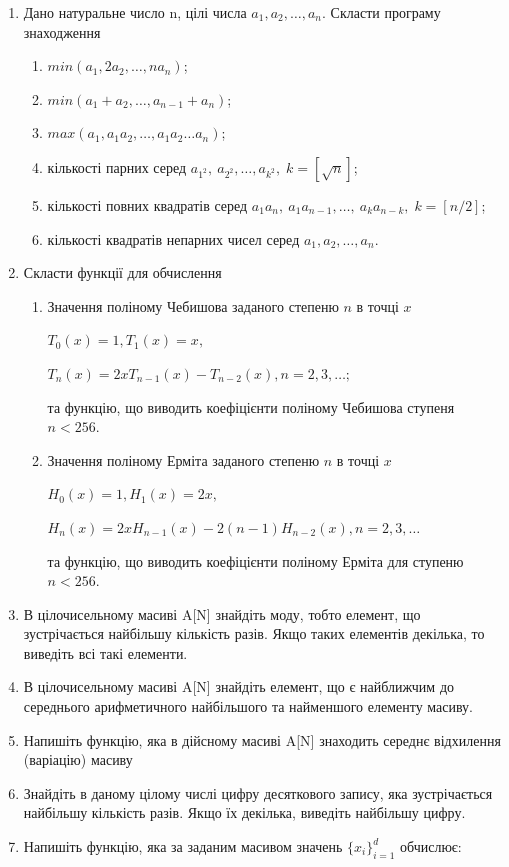 \documentclass[a5paper,titlepage,openany,twoside,draft]{book_unv}%
\makeatletter
\newcommand{\xslalph}[1]{\expandafter\@xslalph\csname c@#1\endcsname}
\newcommand{\@xslalph}[1]{%
    \ifcase#1\or а\or б\or в\or г\or д\or e\or є\or ж\or з\or i%
    \or й\or к\or л\or м\or н\or о\or п\or р\or с\or т%
    \or у\or ф\or х\or ц\or ч\or ш\or ю\or я\or аа\or бб\or вв%
    \else\@ctrerr\fi%
}
\makeatother
\begin{document}
\begin{enumerate}
\begin{enumerate}[label=\xslalph*)]
\end{enumerate}

\item Дано натуральне число n, цілі числа \(a_{1},a_{2},\ldots,a_{n}\).
Скласти програму знаходження
\begin{enumerate}[label=\xslalph*)]
\item
 \(min(a_{1},2a_{2},\ldots,na_{n})\);
\item \(min(a_{1} + a_{2},\ldots,a_{n - 1} + a_{n})\);
\item \(max(a_{1},a_{1}a_{2},\ldots,a_{1}a_{2}\ldots a_{n})\);
\item кількості парних серед \(a_{1^2},\ a_{2^2},\ldots,a_{k^2},\; k=[\sqrt{n}] \);
\item кількості повних квадратів серед \(a_{1}a_{n},\ a_{1}a_{n-1},\ldots,\ a_{k}a_{n-k},\; k=[n/2]\);
\item кількості квадратів непарних чисел серед
\(a_{1},a_{2},\ldots,a_{n}\).
\end{enumerate}

\item
Скласти функції для обчислення
\begin{enumerate}[label=\xslalph*)]
\item
Значення поліному Чебишова заданого степеню \(n\) в точці \(x\)

\(T_{0}(x) = 1,T_{1}(x) = x,\)

\(T_{n}(x) = 2xT_{n - 1}(x) - T_{n - 2}(x),n = 2,3,\ldots;\)

та функцію, що виводить коефіцієнти поліному Чебишова ступеня $n<256$.

\item
Значення поліному Ерміта заданого степеню \(n\) в точці \(x\)

\(H_{0}(x) = 1,H_{1}(x) = 2x,\)

\(H_{n}(x) = 2xH_{n - 1}(x) - 2(n - 1)H_{n - 2}(x),n = 2,3,\ldots\)

та функцію, що виводить коефіцієнти поліному Ерміта для ступеню $n<256$.
\end{enumerate}
\item
  В цілочисельному масиві A{[}N{]} знайдіть моду, тобто елемент, що
  зустрічається найбільшу кількість разів. Якщо таких елементів декілька,
  то виведіть всі такі елементи.

\item
  В цілочисельному масиві A{[}N{]} знайдіть елемент, що є найближчим до
  середнього арифметичного найбільшого та найменшого елементу масиву.
\item
  Напишіть функцію, яка в дійсному масиві A{[}N{]} знаходить середнє
  відхилення (варіацію) масиву
\item
  Знайдіть в даному цілому числі цифру десяткового запису, яка
  зустрічається найбільшу кількість разів. Якщо їх декілька, виведіть
  найбільшу цифру.
\item
  Напишіть функцію, яка за заданим масивом значень
  \({\{ x_{i}\}}_{i = 1}^{d}\) обчислює:


\end{enumerate}
\end{document}
